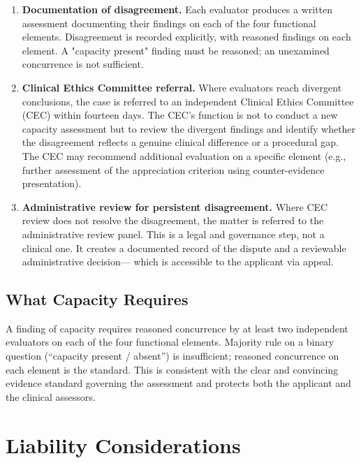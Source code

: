 \documentclass[11pt, letterpaper]{article}
\begin{document}
\begin{enumerate}
  \item \textbf{Documentation of disagreement.} Each evaluator produces a written
    assessment documenting their findings on each of the four functional elements.
    Disagreement is recorded explicitly, with reasoned findings on each element.
    A "capacity present" finding must be reasoned; an unexamined concurrence is not
    sufficient.

  \item \textbf{Clinical Ethics Committee referral.} Where evaluators reach divergent
    conclusions, the case is referred to an independent Clinical Ethics Committee (CEC)
    within fourteen days. The CEC's function is not to conduct a new capacity assessment
    but to review the divergent findings and identify whether the disagreement reflects
    a genuine clinical difference or a procedural gap. The CEC may recommend additional
    evaluation on a specific element (e.g., further assessment of the appreciation
    criterion using counter-evidence presentation).

  \item \textbf{Administrative review for persistent disagreement.} Where CEC review
    does not resolve the disagreement, the matter is referred to the administrative
    review panel. This is a legal and governance step, not a clinical one. It creates
    a documented record of the dispute and a reviewable administrative decision---
    which is accessible to the applicant via appeal.
\end{enumerate}

\subsection{What Capacity Requires}

A finding of capacity requires reasoned concurrence by at least two independent
evaluators on each of the four functional elements. Majority rule on a binary question
(``capacity present / absent'') is insufficient; reasoned concurrence on each element
is the standard. This is consistent with the clear and convincing evidence standard
governing the assessment and protects both the applicant and the clinical assessors.

\section{Liability Considerations}
\end{document}
